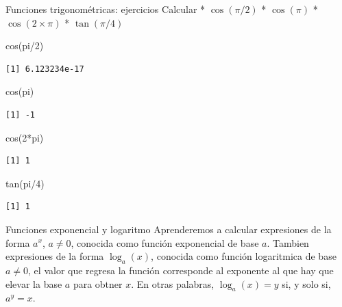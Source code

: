 \documentclass[
  ignorenonframetext,
  aspectratio=169,
  spanish,
]{beamer}
\newenvironment{Shaded}{\begin{snugshade}}{\end{snugshade}}
\newcommand{\DecValTok}[1]{\textcolor[rgb]{0.68,0.00,0.00}{#1}}
\newcommand{\FunctionTok}[1]{\textcolor[rgb]{0.28,0.35,0.67}{#1}}
\newcommand{\NormalTok}[1]{\textcolor[rgb]{0.00,0.23,0.31}{#1}}
\newcommand{\SpecialCharTok}[1]{\textcolor[rgb]{0.37,0.37,0.37}{#1}}
\begin{document}
\begin{frame}[fragile]{Funciones trigonométricas: ejercicios}
\label{funciones-trigonomuxe9tricas-ejercicios}
Calcular * \(\cos(\pi/2)\) * \(\cos(\pi)\) * \(\cos(2\times \pi)\) *
\(\tan(\pi/4)\)

\begin{Shaded}
\begin{Highlighting}[]
\FunctionTok{cos}\NormalTok{(pi}\SpecialCharTok{/}\DecValTok{2}\NormalTok{)}
\end{Highlighting}
\end{Shaded}

\begin{verbatim}
[1] 6.123234e-17
\end{verbatim}

\begin{Shaded}
\begin{Highlighting}[]
\FunctionTok{cos}\NormalTok{(pi)}
\end{Highlighting}
\end{Shaded}

\begin{verbatim}
[1] -1
\end{verbatim}

\begin{Shaded}
\begin{Highlighting}[]
\FunctionTok{cos}\NormalTok{(}\DecValTok{2}\SpecialCharTok{*}\NormalTok{pi)}
\end{Highlighting}
\end{Shaded}

\begin{verbatim}
[1] 1
\end{verbatim}

\begin{Shaded}
\begin{Highlighting}[]
\FunctionTok{tan}\NormalTok{(pi}\SpecialCharTok{/}\DecValTok{4}\NormalTok{)}
\end{Highlighting}
\end{Shaded}

\begin{verbatim}
[1] 1
\end{verbatim}
\end{frame}

\begin{frame}{Funciones exponencial y logaritmo}
\label{funciones-exponencial-y-logaritmo}
Aprenderemos a calcular expresiones de la forma \(a^x\), \(a \neq 0\),
conocida como función exponencial de base \(a\). Tambien expresiones de
la forma \(\log_a(x)\), conocida como función logaritmica de base
\(a \neq 0\), el valor que regresa la función corresponde al exponente
al que hay que elevar la base \(a\) para obtner \(x\). En otras
palabras, \(\log_a(x)=y\) si, y solo si, \(a^y=x\).
\end{frame}
\end{document}
